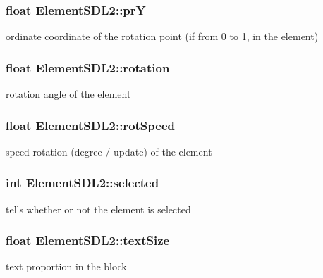 \subsubsection[{\texorpdfstring{prY}{prY}}]{\setlength{\rightskip}{0pt plus 5cm}float Element\+S\+D\+L2\+::prY}\hypertarget{structElementSDL2_a23b79d2468ca18e33071cd137f6961c6}{}\label{structElementSDL2_a23b79d2468ca18e33071cd137f6961c6}
ordinate coordinate of the rotation point (if from 0 to 1, in the element) 
\subsubsection[{\texorpdfstring{rotation}{rotation}}]{\setlength{\rightskip}{0pt plus 5cm}float Element\+S\+D\+L2\+::rotation}\hypertarget{structElementSDL2_a8bbd5c157ceaba03f33b77e71daa7a79}{}\label{structElementSDL2_a8bbd5c157ceaba03f33b77e71daa7a79}
rotation angle of the element 
\subsubsection[{\texorpdfstring{rot\+Speed}{rotSpeed}}]{\setlength{\rightskip}{0pt plus 5cm}float Element\+S\+D\+L2\+::rot\+Speed}\hypertarget{structElementSDL2_a46a53dcb3d0d119e5df7cd276de2c4ae}{}\label{structElementSDL2_a46a53dcb3d0d119e5df7cd276de2c4ae}
speed rotation (degree / update) of the element 
\subsubsection[{\texorpdfstring{selected}{selected}}]{\setlength{\rightskip}{0pt plus 5cm}int Element\+S\+D\+L2\+::selected}\hypertarget{structElementSDL2_a2cae92fe5dd207db485261128b82bc02}{}\label{structElementSDL2_a2cae92fe5dd207db485261128b82bc02}
tells whether or not the element is selected 
\subsubsection[{\texorpdfstring{text\+Size}{textSize}}]{\setlength{\rightskip}{0pt plus 5cm}float Element\+S\+D\+L2\+::text\+Size}\hypertarget{structElementSDL2_a49a55a004e56ad15b5b0f0cb0045c83f}{}\label{structElementSDL2_a49a55a004e56ad15b5b0f0cb0045c83f}
text proportion in the block 
